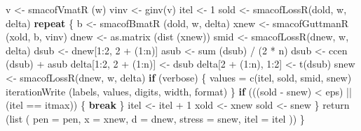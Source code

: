 \documentclass[
  12pt,
  letterpaper,
  DIV=11,
  numbers=noendperiod]{scrreprt}
\newenvironment{Shaded}{\begin{snugshade}}{\end{snugshade}}
\newcommand{\AttributeTok}[1]{\textcolor[rgb]{0.40,0.45,0.13}{#1}}
\newcommand{\ControlFlowTok}[1]{\textcolor[rgb]{0.00,0.23,0.31}{\textbf{#1}}}
\newcommand{\DecValTok}[1]{\textcolor[rgb]{0.68,0.00,0.00}{#1}}
\newcommand{\FunctionTok}[1]{\textcolor[rgb]{0.28,0.35,0.67}{#1}}
\newcommand{\NormalTok}[1]{\textcolor[rgb]{0.00,0.23,0.31}{#1}}
\newcommand{\OtherTok}[1]{\textcolor[rgb]{0.00,0.23,0.31}{#1}}
\newcommand{\SpecialCharTok}[1]{\textcolor[rgb]{0.37,0.37,0.37}{#1}}
\theoremstyle{remark}
\begin{document}
\begin{Shaded}
\begin{Highlighting}[]
\NormalTok{    v }\OtherTok{\textless{}{-}} \FunctionTok{smacofVmatR}\NormalTok{ (w)}
\NormalTok{    vinv }\OtherTok{\textless{}{-}} \FunctionTok{ginv}\NormalTok{(v)}
\NormalTok{    itel }\OtherTok{\textless{}{-}} \DecValTok{1}
\NormalTok{    sold }\OtherTok{\textless{}{-}} \FunctionTok{smacofLossR}\NormalTok{(dold, w, delta)}
    \ControlFlowTok{repeat}\NormalTok{ \{}
\NormalTok{      b }\OtherTok{\textless{}{-}} \FunctionTok{smacofBmatR}\NormalTok{ (dold, w, delta)}
\NormalTok{      xnew }\OtherTok{\textless{}{-}} \FunctionTok{smacofGuttmanR}\NormalTok{ (xold, b, vinv)}
\NormalTok{      dnew }\OtherTok{\textless{}{-}} \FunctionTok{as.matrix}\NormalTok{ (}\FunctionTok{dist}\NormalTok{ (xnew))}
\NormalTok{      smid }\OtherTok{\textless{}{-}} \FunctionTok{smacofLossR}\NormalTok{(dnew, w, delta)}
\NormalTok{      dsub }\OtherTok{\textless{}{-}}\NormalTok{ dnew[}\DecValTok{1}\SpecialCharTok{:}\DecValTok{2}\NormalTok{, }\DecValTok{2} \SpecialCharTok{+}\NormalTok{ (}\DecValTok{1}\SpecialCharTok{:}\NormalTok{n)]}
\NormalTok{      asub }\OtherTok{\textless{}{-}} \FunctionTok{sum}\NormalTok{ (dsub) }\SpecialCharTok{/}\NormalTok{ (}\DecValTok{2} \SpecialCharTok{*}\NormalTok{ n)}
\NormalTok{      dsub }\OtherTok{\textless{}{-}} \FunctionTok{ccen}\NormalTok{ (dsub) }\SpecialCharTok{+}\NormalTok{ asub}
\NormalTok{      delta[}\DecValTok{1}\SpecialCharTok{:}\DecValTok{2}\NormalTok{, }\DecValTok{2} \SpecialCharTok{+}\NormalTok{ (}\DecValTok{1}\SpecialCharTok{:}\NormalTok{n)] }\OtherTok{\textless{}{-}}\NormalTok{ dsub}
\NormalTok{      delta[}\DecValTok{2} \SpecialCharTok{+}\NormalTok{ (}\DecValTok{1}\SpecialCharTok{:}\NormalTok{n), }\DecValTok{1}\SpecialCharTok{:}\DecValTok{2}\NormalTok{] }\OtherTok{\textless{}{-}} \FunctionTok{t}\NormalTok{(dsub)}
\NormalTok{      snew }\OtherTok{\textless{}{-}} \FunctionTok{smacofLossR}\NormalTok{(dnew, w, delta)}
      \ControlFlowTok{if}\NormalTok{ (verbose) \{}
\NormalTok{        values }\OtherTok{=} \FunctionTok{c}\NormalTok{(itel, sold, smid, snew)}
        \FunctionTok{iterationWrite}\NormalTok{ (labels, values, digits, width, format)}
\NormalTok{      \}}
      \ControlFlowTok{if}\NormalTok{ (((sold }\SpecialCharTok{{-}}\NormalTok{ snew) }\SpecialCharTok{\textless{}}\NormalTok{ eps) }\SpecialCharTok{||}\NormalTok{ (itel }\SpecialCharTok{==}\NormalTok{ itmax)) \{}
        \ControlFlowTok{break}
\NormalTok{      \}}
\NormalTok{      itel }\OtherTok{\textless{}{-}}\NormalTok{ itel }\SpecialCharTok{+} \DecValTok{1}
\NormalTok{      xold }\OtherTok{\textless{}{-}}\NormalTok{ xnew}
\NormalTok{      sold }\OtherTok{\textless{}{-}}\NormalTok{ snew}
\NormalTok{    \}}
    \FunctionTok{return}\NormalTok{ (}\FunctionTok{list}\NormalTok{ (}
      \AttributeTok{pen =}\NormalTok{ pen,}
      \AttributeTok{x =}\NormalTok{ xnew,}
      \AttributeTok{d =}\NormalTok{ dnew,}
      \AttributeTok{stress =}\NormalTok{ snew,}
      \AttributeTok{itel =}\NormalTok{ itel}
\NormalTok{    ))}
\NormalTok{  \}}
\end{Highlighting}
\end{Shaded}
\end{document}
